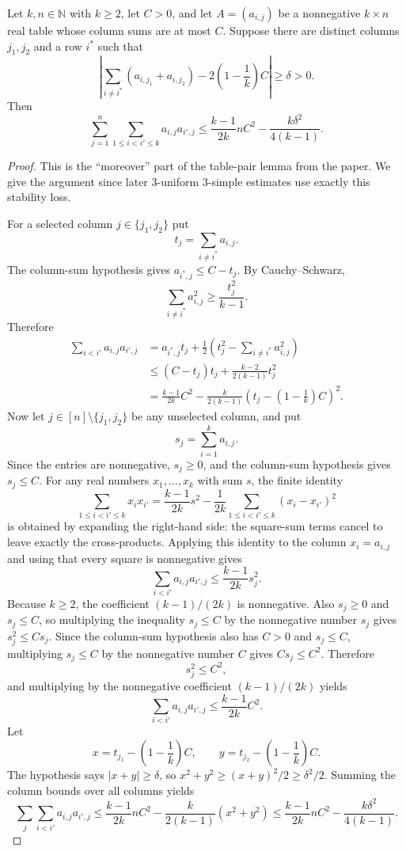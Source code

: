 \begin{lemma}
Let $k,n\in\mathbb N$ with $k\ge2$, let $C>0$, and let
$A=(a_{i,j})$ be a nonnegative $k\times n$ real table whose column sums are at
most $C$.  Suppose there are distinct columns $j_1,j_2$ and a row $i^*$ such
that
\[
\left|
\sum_{i\ne i^*}(a_{i,j_1}+a_{i,j_2})
-2\left(1-\frac1k\right)C
\right|\ge \delta>0 .
\]
Then
\[
\sum_{j=1}^n\sum_{1\le i<i'\le k}a_{i,j}a_{i',j}
\le
\frac{k-1}{2k}nC^2-\frac{k\delta^2}{4(k-1)} .
\]
\end{lemma}
\begin{proof}
This is the ``moreover'' part of the table-pair lemma from the paper.  We give
the argument since later 3-uniform 3-simple estimates use exactly this
stability loss.

For a selected column $j\in\{j_1,j_2\}$ put
\[
t_j=\sum_{i\ne i^*}a_{i,j}.
\]
The column-sum hypothesis gives $a_{i^*,j}\le C-t_j$.  By Cauchy--Schwarz,
\[
\sum_{i\ne i^*}a_{i,j}^2\ge \frac{t_j^2}{k-1}.
\]
Therefore
\[
\begin{aligned}
\sum_{i<i'}a_{i,j}a_{i',j}
&=a_{i^*,j}t_j+
\frac12\left(t_j^2-\sum_{i\ne i^*}a_{i,j}^2\right)\\
&\le (C-t_j)t_j+\frac{k-2}{2(k-1)}t_j^2\\
&=\frac{k-1}{2k}C^2
-\frac{k}{2(k-1)}
\left(t_j-\left(1-\frac1k\right)C\right)^2 .
\end{aligned}
\]
Now let $j\in[n]\setminus\{j_1,j_2\}$ be any unselected column, and put
\[
s_j=\sum_{i=1}^k a_{i,j}.
\]
Since the entries are nonnegative, $s_j\ge0$, and the column-sum hypothesis
gives $s_j\le C$.  For any real numbers $x_1,\ldots,x_k$ with sum $s$, the
finite identity
\[
\sum_{1\le i<i'\le k}x_ix_{i'}
=\frac{k-1}{2k}s^2
-\frac1{2k}\sum_{1\le i<i'\le k}(x_i-x_{i'})^2
\]
is obtained by expanding the right-hand side: the square-sum terms cancel to
leave exactly the cross-products.  Applying this identity to the column
$x_i=a_{i,j}$ and using that every square is nonnegative gives
\[
\sum_{i<i'}a_{i,j}a_{i',j}
\le \frac{k-1}{2k}s_j^2 .
\]
Because $k\ge2$, the coefficient $(k-1)/(2k)$ is nonnegative.  Also
$s_j\ge0$ and $s_j\le C$, so multiplying the inequality $s_j\le C$ by the
nonnegative number $s_j$ gives $s_j^2\le Cs_j$.  Since the column-sum
hypothesis also has $C>0$ and $s_j\le C$, multiplying $s_j\le C$ by the
nonnegative number $C$ gives $Cs_j\le C^2$.  Therefore
\[
s_j^2\le C^2,
\]
and multiplying by the nonnegative coefficient $(k-1)/(2k)$ yields
\[
\sum_{i<i'}a_{i,j}a_{i',j}\le \frac{k-1}{2k}C^2 .
\]
Let
\[
x=t_{j_1}-\left(1-\frac1k\right)C,\qquad
y=t_{j_2}-\left(1-\frac1k\right)C .
\]
The hypothesis says $|x+y|\ge\delta$, so
$x^2+y^2\ge (x+y)^2/2\ge\delta^2/2$.  Summing the column bounds over all
columns yields
\[
\sum_j\sum_{i<i'}a_{i,j}a_{i',j}
\le \frac{k-1}{2k}nC^2
-\frac{k}{2(k-1)}(x^2+y^2)
\le \frac{k-1}{2k}nC^2-\frac{k\delta^2}{4(k-1)} .
\]
\end{proof}
